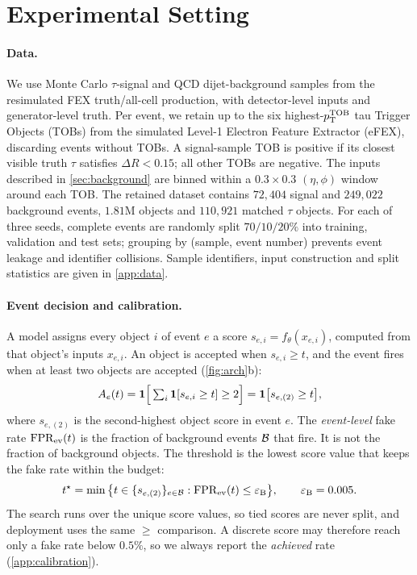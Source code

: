 \section{Experimental Setting}
\label{sec:setting}

\paragraph{Data.}
We use Monte Carlo $\tau$-signal and QCD dijet-background samples from the resimulated FEX truth/all-cell production, with detector-level inputs and generator-level truth. Per event, we retain up to the six highest-$p_{\mathrm{T}}^{\mathrm{TOB}}$ tau Trigger Objects (TOBs) from the simulated Level-1 Electron Feature Extractor (eFEX), discarding events without TOBs. A signal-sample TOB is positive if its closest visible truth $\tau$ satisfies $\Delta R<0.15$; all other TOBs are negative. The inputs described in \cref{sec:background} are binned within a $0.3\times0.3$ $(\eta,\phi)$ window around each TOB. The retained dataset contains $72{,}404$ signal and $249{,}022$ background events, $1.81$M objects and $110{,}921$ matched $\tau$ objects. For each of three seeds, complete events are randomly split $70/10/20\%$ into training, validation and test sets; grouping by (sample, event number) prevents event leakage and identifier collisions. Sample identifiers, input construction and split statistics are given in \cref{app:data}.

\paragraph{Event decision and calibration.}
A model assigns every object $i$ of event $e$ a score $s_{e,i}=f_\theta(x_{e,i})$, computed from that object's inputs $x_{e,i}$. An object is accepted when $s_{e,i}\geq t$, and the event fires when at least two objects are accepted (\cref{fig:arch}b):
\begin{equation}
  A_e(t)=\mathbf{1}\Big[\textstyle\sum_i\mathbf{1}[s_{e,i}\geq t]\geq2\Big]=\mathbf{1}\big[s_{e,(2)}\geq t\big],
  \label{eq:event_decision}
\end{equation}
where $s_{e,(2)}$ is the second-highest object score in event $e$. The \emph{event-level} fake rate $\mathrm{FPR}_{\mathrm{ev}}(t)$ is the fraction of background events $\mathcal{B}$ that fire. It is not the fraction of background objects. The threshold is the lowest score value that keeps the fake rate within the budget:
\begin{equation}
  t^\star=\min\big\{t\in\{s_{e,(2)}\}_{e\in\mathcal{B}}:\mathrm{FPR}_{\mathrm{ev}}(t)\leq\varepsilon_{\mathrm{B}}\big\},\qquad\varepsilon_{\mathrm{B}}=0.005 .
  \label{eq:calibration}
\end{equation}
The search runs over the unique score values, so tied scores are never split, and deployment uses the same $\geq$ comparison. A discrete score may therefore reach only a fake rate below $0.5\%$, so we always report the \emph{achieved} rate (\cref{app:calibration}).

